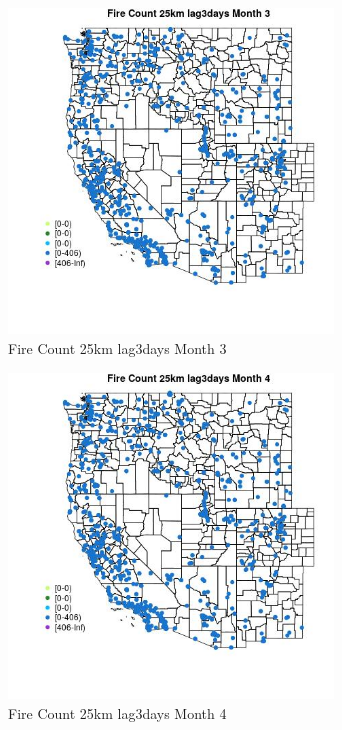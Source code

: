 \begin{figure} 
\centering  
\includegraphics[width=0.77\textwidth]{Code_Outputs/Report_ML_input_PM25_Step4_part_f_de_duplicated_aves_prioritize_24hr_obswNAs_MapObsMo3Fire_Count_25km_lag3days.jpg} 
\caption{\label{fig:Report_ML_input_PM25_Step4_part_f_de_duplicated_aves_prioritize_24hr_obswNAsMapObsMo3Fire_Count_25km_lag3days}Fire Count 25km lag3days Month 3} 
\end{figure} 
 

\clearpage 

\begin{figure} 
\centering  
\includegraphics[width=0.77\textwidth]{Code_Outputs/Report_ML_input_PM25_Step4_part_f_de_duplicated_aves_prioritize_24hr_obswNAs_MapObsMo4Fire_Count_25km_lag3days.jpg} 
\caption{\label{fig:Report_ML_input_PM25_Step4_part_f_de_duplicated_aves_prioritize_24hr_obswNAsMapObsMo4Fire_Count_25km_lag3days}Fire Count 25km lag3days Month 4} 
\end{figure} 
 

